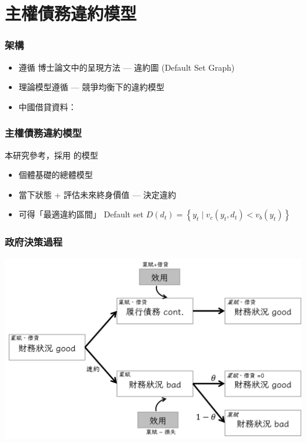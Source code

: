 \documentclass[mathserif]{beamer}
\begin{document}
    \section{主權債務違約模型}
    \begin{frame}
        \frametitle{架構}
        \begin{itemize}
            \item 遵循 \citet{Hinrichsen_2020-chapter4}博士論文中的呈現方法 --- 違約圖 (Default Set Graph)
            \item 理論模型遵循 \citet*{Na-18} --- 競爭均衡下的違約模型
            \item 中國借貸資料：\citet*{Horn-Reinhart-Trebesch-21}
        \end{itemize}
    \end{frame}

    \begin{frame}
        \frametitle{主權債務違約模型}
        本研究參考\citet{Hinrichsen_2020-chapter4}，採用 \citet{Na-18} 的模型
        \begin{itemize}
            \item 個體基礎的總體模型
            \item 當下狀態 + 評估未來終身價值 --- 決定違約
            \item 可得「最適違約區間」 Default set $D(d_t) = \left\{ y_t \mid v_c(y_t, d_t) < v_b(y_t) \right\}$
        \end{itemize}
    \end{frame}

    \begin{frame}[label = {vf}]
        \frametitle{政府決策過程}
        \includegraphics[width = \textwidth]{fig/value_fucntion_flow.png}
    \end{frame}
\end{document}
